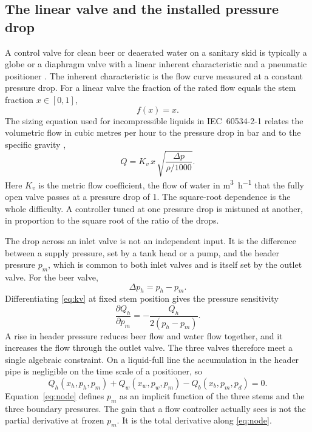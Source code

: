 \subsection{The linear valve and the installed pressure drop}

A control valve for clean beer or deaerated water on a sanitary skid is typically a globe or a diaphragm valve with a linear inherent characteristic and a pneumatic positioner \cite{fisher2005valve,iec60534general,iec60534}. The inherent characteristic is the flow curve measured at a constant pressure drop. For a linear valve the fraction of the rated flow equals the stem fraction $x\in[0,1]$,
\begin{equation}
\label{eq:inherent}
f(x) = x.
\end{equation}
The sizing equation used for incompressible liquids in IEC~60534-2-1 relates the volumetric flow in cubic metres per hour to the pressure drop in bar and to the specific gravity \cite{iec60534,fisher2005valve},
\begin{equation}
\label{eq:kv}
Q = K_v\, x\, \sqrt{\frac{\Delta p}{\rho/1000}}.
\end{equation}
Here $K_v$ is the metric flow coefficient, the flow of water in \si{\cubic\metre\per\hour} that the fully open valve passes at a pressure drop of \SI{1}{\barg}. The square-root dependence is the whole difficulty. A controller tuned at one pressure drop is mistuned at another, in proportion to the square root of the ratio of the drops.

The drop across an inlet valve is not an independent input. It is the difference between a supply pressure, set by a tank head or a pump, and the header pressure $p_m$, which is common to both inlet valves and is itself set by the outlet valve. For the beer valve,
\begin{equation}
\label{eq:dp-beer}
\Delta p_h = p_h - p_m.
\end{equation}
Differentiating \eqref{eq:kv} at fixed stem position gives the pressure sensitivity
\begin{equation}
\label{eq:pressure-sensitivity}
\frac{\partial Q_h}{\partial p_m} = -\frac{Q_h}{2(p_h-p_m)}.
\end{equation}
A rise in header pressure reduces beer flow and water flow together, and it increases the flow through the outlet valve. The three valves therefore meet a single algebraic constraint. On a liquid-full line the accumulation in the header pipe is negligible on the time scale of a positioner, so
\begin{equation}
\label{eq:node}
Q_h(x_h,p_h,p_m) + Q_w(x_w,p_w,p_m) - Q_b(x_b,p_m,p_d) = 0.
\end{equation}
Equation~\eqref{eq:node} defines $p_m$ as an implicit function of the three stems and the three boundary pressures. The gain that a flow controller actually sees is not the partial derivative at frozen $p_m$. It is the total derivative along \eqref{eq:node}.

